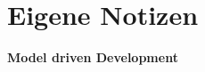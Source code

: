 \section{Eigene Notizen}
\textbf{Model driven Development}\\
\newpage \ \\
\newpage \ \\
\newpage \ \\
\newpage \ \\